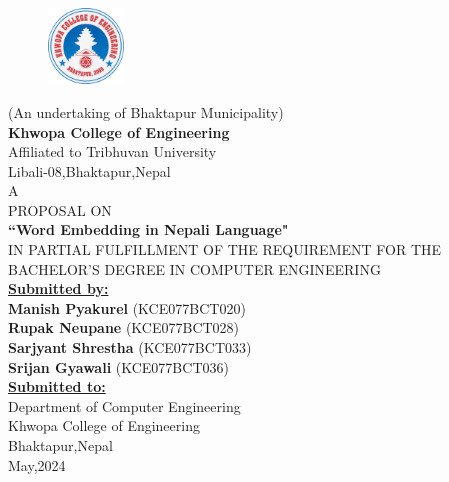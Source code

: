 \begin{center}
	\thispagestyle{empty}
	\begin{figure}[h!]
		\centering
			\includegraphics[width=0.18\textwidth]{img/khwopa logo hd.png}
	\end{figure}
	 \normalsize(An undertaking of Bhaktapur Municipality)\\
	 \Large\textbf{Khwopa College of Engineering}\\
	 \normalsize Affiliated to Tribhuvan University\\
	\normalsize{{{Libali-08,Bhaktapur,Nepal}}\\[0.75cm]
	\large{A \\PROPOSAL ON\\\textbf{``Word Embedding in Nepali Language"}}\\\vspace{0.1in}
	 \normalsize{IN PARTIAL FULFILLMENT OF THE REQUIREMENT
FOR THE BACHELOR’S DEGREE IN COMPUTER ENGINEERING} \\[0.65cm]
	
	
	
	\large\textbf{\underline{Submitted by:}}\\
	
{\bf Manish Pyakurel} (KCE077BCT020)\\
{\bf Rupak Neupane} (KCE077BCT028)\\
{\bf Sarjyant Shrestha} (KCE077BCT033)\\
{\bf Srijan Gyawali} (KCE077BCT036)\\[0.75cm]
\large\textbf{\underline{Submitted to:}}\\
\large Department of Computer Engineering\\
\large Khwopa College of Engineering\\
\large Bhaktapur,Nepal\\[0.75cm]
\large{May,2024}
}
\end{center}